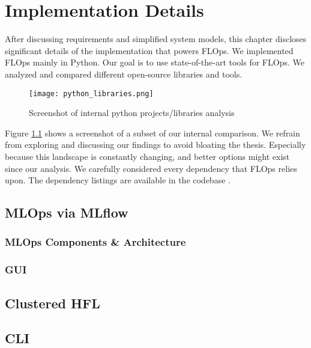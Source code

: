 \chapter{Implementation Details}

After discussing requirements and simplified system models, this chapter discloses significant details of the implementation that powers FLOps.
We implemented FLOps mainly in Python.
Our goal is to use state-of-the-art tools for FLOps.
We analyzed and compared different open-source libraries and tools.

\begin{figure}[h]
    \begin{adjustwidth}{-0.175\paperwidth}{-0.175\paperwidth}
        \centering
        \texttt{[image: python\_libraries.png]}
        \caption{Screenshot of internal python projects/libraries analysis}
        \label{fig:python_projects_libraries}
    \end{adjustwidth}
\end{figure}

Figure \ref{fig:python_projects_libraries} shows a screenshot of a subset of our internal comparison.
We refrain from exploring and discussing our findings to avoid bloating the thesis.
Especially because this landscape is constantly changing, and better options might exist since our analysis. 
We carefully considered every dependency that FLOps relies upon.
The dependency listings are available in the codebase \cite{flops_code}.








\section{MLOps via MLflow}

    \subsection{MLOps Components \& Architecture}

    \subsection{GUI}

\section{Clustered HFL}

\section{CLI}

